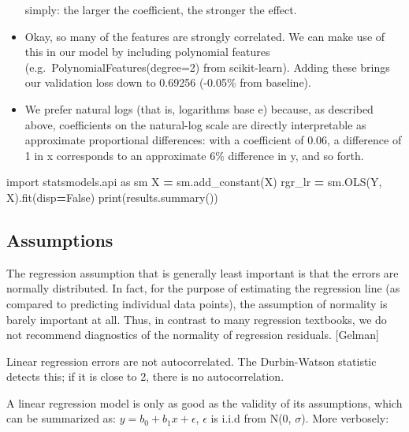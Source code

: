 \documentclass[]{book}
\newenvironment{Shaded}{\begin{snugshade}}{\end{snugshade}}
\newcommand{\ImportTok}[1]{#1}
\newcommand{\VariableTok}[1]{\textcolor[rgb]{0.00,0.00,0.00}{#1}}
\newcommand{\OperatorTok}[1]{\textcolor[rgb]{0.81,0.36,0.00}{\textbf{#1}}}
\newcommand{\BuiltInTok}[1]{#1}
\newcommand{\NormalTok}[1]{#1}
\theoremstyle{definition}
\theoremstyle{definition}
\theoremstyle{definition}
\theoremstyle{remark}
\begin{document}
\begin{itemize}
  simply: the larger the coefficient, the stronger the effect.
\item
  Okay, so many of the features are strongly correlated. We can make use
  of this in our model by including polynomial features
  (e.g.~PolynomialFeatures(degree=2) from scikit-learn). Adding these
  brings our validation loss down to 0.69256 (-0.05\% from baseline).
\item
  We prefer natural logs (that is, logarithms base e) because, as
  described above, coefficients on the natural-log scale are directly
  interpretable as approximate proportional differences: with a
  coefficient of 0.06, a difference of 1 in x corresponds to an
  approximate 6\% difference in y, and so forth.
\end{itemize}

\begin{Shaded}
\begin{Highlighting}[]
\ImportTok{import}\NormalTok{ statsmodels.api }\ImportTok{as}\NormalTok{ sm}
\NormalTok{X }\OperatorTok{=}\NormalTok{ sm.add_constant(X)}
\NormalTok{rgr_lr }\OperatorTok{=}\NormalTok{ sm.OLS(Y, X).fit(disp}\OperatorTok{=}\VariableTok{False}\NormalTok{)}
\BuiltInTok{print}\NormalTok{(results.summary())}
\end{Highlighting}
\end{Shaded}

\subsection{Assumptions}\label{assumptions}

The regression assumption that is generally least important is that the
errors are normally distributed. In fact, for the purpose of estimating
the regression line (as compared to predicting individual data points),
the assumption of normality is barely important at all. Thus, in
contrast to many regression textbooks, we do not recommend diagnostics
of the normality of regression residuals. {[}Gelman{]}

Linear regression errors are not autocorrelated. The Durbin-Watson
statistic detects this; if it is close to 2, there is no
autocorrelation.

A linear regression model is only as good as the validity of its
assumptions, which can be summarized as: \(y = b_0+b_1x + \epsilon\),
\(\epsilon\) is i.i.d from N(0, \(\sigma\)). More verbosely:
\end{document}
